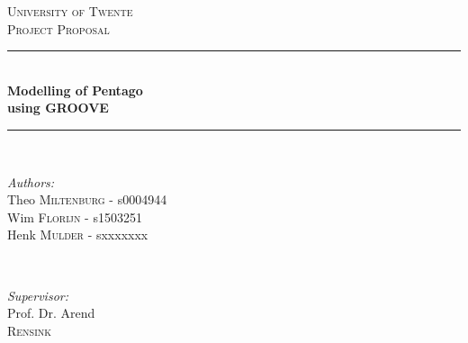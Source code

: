 \begin{titlepage}

\newcommand{\HRule}{\rule{\linewidth}{0.5mm}} %

\center %
 

\textsc{\LARGE University of Twente}\\[1.5cm] %
\textsc{\Large Project Proposal}\\[0.5cm] %


\HRule \\[0.4cm]
{ \huge \bfseries Modelling of Pentago}\\[0.4cm] %
\vspace{-1mm}
{ \huge \bfseries using GROOVE}\\[0.4cm] %
\HRule \\[1.5cm]
 

\begin{minipage}[t]{0.5\linewidth}
\begin{flushleft} \large
\emph{Authors:}\\
Theo \textsc{Miltenburg }  -  s0004944\\ %
Wim \textsc{Florijn}   - s1503251\\%
Henk \textsc{Mulder}   - sxxxxxxx%
\end{flushleft}
\end{minipage}
~
\begin{minipage}[t]{0.42\linewidth}
\begin{flushright} \large
\emph{Supervisor:} \\
Prof. Dr. Arend \\
\textsc{Rensink}%
\end{flushright}
\end{minipage}\\[2cm]


\end{titlepage}
